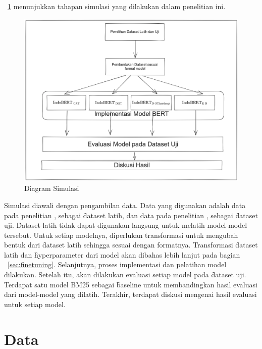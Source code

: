 \pic~\ref{fig:diagram-simulasi} menunjukkan tahapan simulasi yang dilakukan dalam penelitian ini.
\begin{figure}[!ht]
    \centering
    \includegraphics[width=1\textwidth]{assets/pics/alursimulasi.png}
    \caption{Diagram Simulasi}
    \label{fig:diagram-simulasi}

\end{figure}

Simulasi diawali dengan pengambilan data. Data yang digunakan adalah data pada penelitian \cite{mmarco}, sebagai \f{dataset} latih, dan data pada penelitian \cite{mrtydi}, \cite{miracl} sebagai \f{dataset} uji. \f{Dataset} latih tidak dapat digunakan langsung untuk melatih model-model tersebut. Untuk setiap modelnya, diperlukan transformasi untuk mengubah bentuk dari \f{dataset} latih sehingga sesuai dengan formatnya. Transformasi \f{dataset} latih dan \f{hyperparameter} dari model akan dibahas lebih lanjut pada bagian \sect~\ref{sec:finetuning}. Selanjutnya, proses implementasi dan pelatihan model dilakukan. Setelah itu, akan dilakukan evaluasi setiap model pada \f{dataset} uji. Terdapat satu model BM25 sebagai \f{baseline} untuk membandingkan hasil evaluasi dari model-model yang dilatih. Terakhir, terdapat diskusi mengenai hasil evaluasi untuk setiap model.

\section{Data}
\label{sec:dataset}

